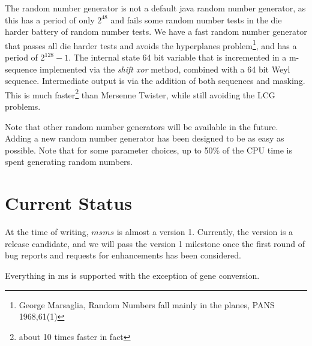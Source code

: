 \documentclass{article}
\begin{document}
The random number generator is not a default java random number generator, as
this has a period of only $2^{48}$ and fails some random number tests in the die
harder battery of random number tests. We have a fast random number generator
that passes all die harder tests and avoids the hyperplanes
problem\footnote{George Marsaglia, Random Numbers fall mainly in the planes,
PANS 1968,61(1)}, and has a period of $2^{128}-1$. The internal state 64 bit variable
that is incremented in a  m-sequence implemented via the {\it shift xor} method,
combined with a 64 bit Weyl sequence. Intermediate output is via the addition of
both sequences and masking. This is much faster\footnote{about 10 times faster in
fact} than Mersenne Twister, while still avoiding the LCG problems.

Note that other random number generators will be available in the future. Adding
a new random number generator has been designed to be as easy as possible. Note
that for some parameter choices, up to 50\% of the CPU time is spent generating
random numbers. 

\section{Current Status}

At the time of writing, $msms$ is almost a version 1. Currently, the version is
a release candidate, and we will pass the version 1 milestone once the first
round of bug reports and requests for enhancements has been considered.

Everything in ms is supported with the exception of gene conversion. 

% 

% 
 
\end{document}
